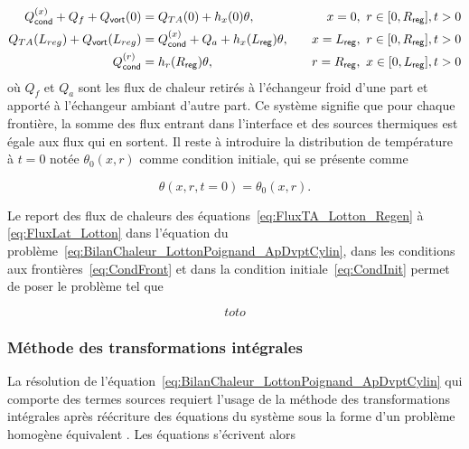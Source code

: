 \begin{subequations}
	\begin{align}
		Q_{\sf cond}^{(x)} + Q_f + Q_{\sf vort}(0) &= Q_{TA}(0) + h_x(0)\theta,\quad &x=0,\ r \in [0,R_{\sf reg}], t>0 \label{eq:CondFront_x_0Froid}\\%
		Q_{TA}(L_{reg}) + Q_{\sf vort}(L_{reg})  &= Q_{\sf cond}^{(x)} + Q_a + h_x(L_{\sf reg})\theta, \quad &x=L_{\sf reg},\ r \in [0,R_{\sf reg}], t>0 \label{eq:CondFront_x_LregAmb}\\%
		Q_{\sf cond}^{(r)} &= h_r(R_{\sf reg})\theta, \quad &r=R_{\sf reg},\ x \in [0,L_{\sf reg}], t>0 \label{eq:CondFront_r_ra}
	\end{align}%
	\label{eq:CondFront}%
\end{subequations}
où $Q_f$ et $Q_a$ sont les flux de chaleur retirés à l'échangeur froid d'une part et apporté à l'échangeur ambiant d'autre part. Ce système signifie que pour chaque frontière, la somme des flux entrant dans l'interface et des sources thermiques est égale aux flux qui en sortent. Il reste à introduire la distribution de température à $t=0$ notée $\theta_0(x,r)$ comme condition initiale, qui se présente comme

\begin{equation}
	\theta(x,r,t=0) = \theta_0(x,r).
	\label{eq:CondInit}
\end{equation}

Le report des flux de chaleurs des équations~\eqref{eq:FluxTA_Lotton_Regen} à \eqref{eq:FluxLat_Lotton} dans l'équation du problème~\eqref{eq:BilanChaleur_LottonPoignand_ApDvptCylin}, dans les conditions aux frontières~\eqref{eq:CondFront} et dans la condition initiale~\eqref{eq:CondInit} permet de poser le problème tel que

\begin{equation}
	toto
	\label{eq:ProbTransitoire_ApDvpt}
\end{equation}

\subsubsection{Méthode des transformations intégrales}\label{chap:TransfoIntegrales}
La résolution de l'équation~\eqref{eq:BilanChaleur_LottonPoignand_ApDvptCylin} qui comporte des termes sources requiert l'usage de la méthode des transformations intégrales après réécriture des équations du système sous la forme d'un problème homogène équivalent \cite{ozisik_heat_1993}. Les équations s'écrivent alors

